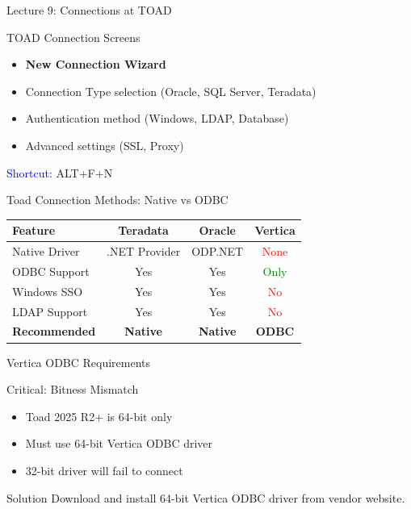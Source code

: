 \documentclass{beamer}
\begin{document}
	\begin{frame}{Lecture 9: Connections at TOAD}
		\begin{block}{TOAD Connection Screens}
			\begin{itemize}
				\item \textbf{New Connection Wizard}
				\item Connection Type selection (Oracle, SQL Server, Teradata)
				\item Authentication method (Windows, LDAP, Database)
				\item Advanced settings (SSL, Proxy)
			\end{itemize}
		\end{block}
		\begin{center}
			\textcolor{blue}{Shortcut:} ALT+F+N
		\end{center}
	\end{frame}
	
	\begin{frame}{Toad Connection Methods: Native vs ODBC}
		\begin{table}
			\small
			\begin{tabular}{|l|c|c|c|}
				\hline
				\textbf{Feature} & \textbf{Teradata} & \textbf{Oracle} & \textbf{Vertica} \\
				\hline
				Native Driver & .NET Provider & ODP.NET & \textcolor{red}{None} \\
				\hline
				ODBC Support & Yes & Yes & \textcolor{green}{Only} \\
				\hline
				Windows SSO & Yes & Yes & \textcolor{red}{No} \\
				\hline
				LDAP Support & Yes & Yes & \textcolor{red}{No} \\
				\hline
				\textbf{Recommended} & \textbf{Native} & \textbf{Native} & \textbf{ODBC} \\
				\hline
			\end{tabular}
		\end{table}
	\end{frame}
	
	\begin{frame}{Vertica ODBC Requirements}
		\begin{alertblock}{Critical: Bitness Mismatch}
			\begin{itemize}
				\item Toad 2025 R2+ is 64-bit only
				\item Must use 64-bit Vertica ODBC driver
				\item 32-bit driver will fail to connect
			\end{itemize}
		\end{alertblock}
		\begin{example}{Solution}
			Download and install 64-bit Vertica ODBC driver from vendor website.
		\end{example}
	\end{frame}
	
\end{document}
